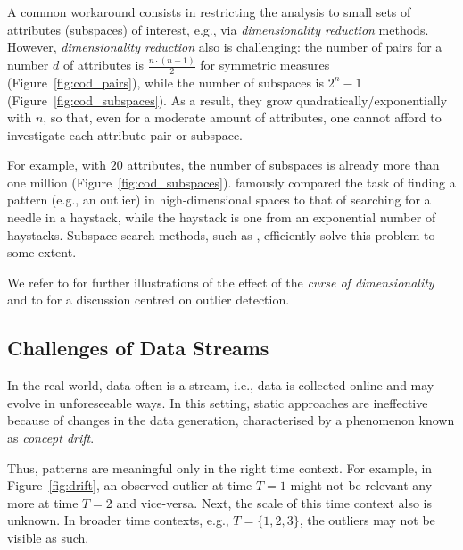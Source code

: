 A common workaround consists in restricting the analysis to small sets of attributes (subspaces) of interest, e.g., via \textit{dimensionality reduction} methods. 
However, \textit{dimensionality reduction} also is challenging: the number of pairs for a number $d$ of attributes is $\frac{n \cdot (n-1)}{2}$ for symmetric measures (Figure~\ref{fig:cod_pairs}), while the number of subspaces is $2^n - 1$ (Figure~\ref{fig:cod_subspaces}). As a result, they grow quadratically/exponentially with $n$, so that, even for a moderate amount of attributes, one cannot afford to investigate each attribute pair or subspace. 

For example, with $20$ attributes, the number of subspaces is already more than one million (Figure~\ref{fig:cod_subspaces}).
\cite{DBLP:books/sp/Aggarwal2013} famously compared the task of finding a pattern (e.g., an outlier) in high-dimensional spaces to that of searching for a needle in a haystack, while the haystack is one from an exponential number of haystacks. Subspace search methods, such as \cite{DBLP:conf/sdm/BohmKMNV13, DBLP:conf/bigdataconf/NguyenMB13, DBLP:conf/icde/KellerMB12, DBLP:journals/ijdsa/TrittenbachB19}, efficiently solve this problem to some extent. 


We refer to \cite{DBLP:books/lib/HastieTF09} for further illustrations of the effect of the \textit{curse of dimensionality} and to \cite{DBLP:journals/sadm/ZimekSK12} for a discussion centred on outlier detection. 

\subsection{Challenges of Data Streams}
\label{challenges:datastreams}

In the real world, data often is a stream, i.e., data is collected online and may evolve in unforeseeable ways. In this setting, static approaches are ineffective \cite{DBLP:journals/pai/Gama12} because of changes in the data generation, characterised by a phenomenon known as \textit{concept drift}.

Thus, patterns are meaningful only in the right time context. For example, in Figure~\ref{fig:drift}, an observed outlier at time $T=1$ might not be relevant any more at time $T=2$ and vice-versa. Next, the scale of this time context also is unknown. In broader time contexts, e.g., $T=\{1,2,3\}$, the outliers may not be visible as such.

